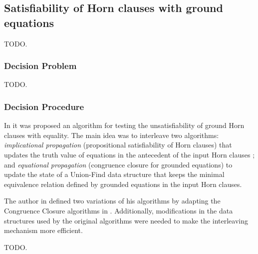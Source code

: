 \subsection{Satisfiability of Horn clauses with ground equations}

TODO.

\subsubsection{Decision Problem}

TODO.

\subsubsection{Decision Procedure}

In \cite{GALLIER1987233} it was proposed an algorithm 
for testing the unsatisfiability
of ground Horn clauses with equality. The main idea was 
to interleave two algorithms: \emph{implicational propagation}
(propositional satisfiability of Horn clauses) that 
updates the truth value of equations in the antecedent 
of the input Horn clauses \cite{DOWLING1984267}; and 
\emph{equational propagation} (congruence closure for 
grounded equations) to update the state of a 
Union-Find data structure \cite{10.1145/364099.364331}
that keeps the minimal equivalence relation defined 
by grounded equations in the input Horn clauses.

The author in \cite{GALLIER1987233} defined two 
variations of his algorithms by adapting
the Congruence Closure algorithms in 
\cite{10.1145/322217.322228, 10.1145/322186.322198}.
Additionally, modifications in the data structures 
used by the original algorithms were needed
to make the interleaving mechanism more efficient.

TODO.

